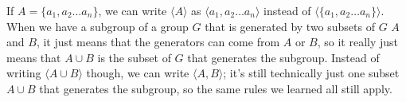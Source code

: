 \documentclass[12pt]{article}
\newcommand{\ang}[1]{\langle #1 \rangle}
\begin{document}
    If $A = \{ a_1, a_2 \dots a_n\}$,
    we can write $\ang{A}$ as $\ang{a_1, a_2 \dots a_n}$
    instead of $\ang{ \{a_1, a_2 \dots a_n\}}$. \\
    When we have a subgroup of a group $G$
    that is generated by two subsets of $G$ $A$ and $B$,
    it just means that the generators can come from $A$
    or $B$,
    so it really just means that $A \cup B$
    is the subset of $G$ that generates the subgroup.
    Instead of writing $\ang{A \cup B}$ though,
    we can write $\ang{A, B}$;
    it's still technically just one subset
    $A \cup B$ that generates the subgroup,
    so the same rules we learned all still apply. \\ 
\end{document}
